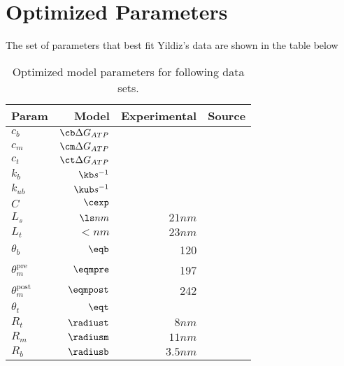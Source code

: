 \section{Optimized Parameters}
The set of parameters that best fit Yildiz's data are shown in the table below


\begin{table}[H]
  \centering
  \begin{tabular}{|l | r | r | r|}
  	\hline
    Param & Model & Experimental & Source \\
    \hline
    $c_b$ & $\cb \Delta G_{ATP}$ &  & \\
    $c_m$ & $\cm \Delta G_{ATP}$ &  & \\
    $c_t$ & $\ct \Delta G_{ATP}$ &  & \\
    $k_b$ & $\kb s^{-1}$&  & \\
    $k_{ub}$ & $\kub s^{-1}$ & & \\
    $C$ & $\cexp$ & & \\
    $L_s$ & $\ls nm$ & $21nm$ & \cite{Burgess2003, 3vkh-cite, carter-paper}\\
    $L_t$ & $\lt nm$ & $23nm$ & \cite{Burgess2003, 3vkh-cite, carter-paper}\\
    $\theta_b$ & $\eqb$ &  120 & \cite{leschziner} \\
    $\theta_m^{\mbox{pre}}$ & $\eqmpre$ &  197 & \cite{Burgess2003}\\
    $\theta_m^{\mbox{post}}$ & $\eqmpost$ & 242 & \cite{Burgess2003}\\
    $\theta_t$ & $\eqt$ &  & \\
    $R_t$ & $\radiust$ & $8nm$ & \cite{Burgess2003}\\
    $R_m$ & $\radiusm$ & $11nm$ & \cite{Burgess2003}\\
    $R_b$ & $\radiusb$ & $3.5nm$ & \cite{Burgess2003}\\
    \hline
  \end{tabular}
  \caption{Optimized model parameters for following data sets. }
  \label{tab:params}
\end{table}

